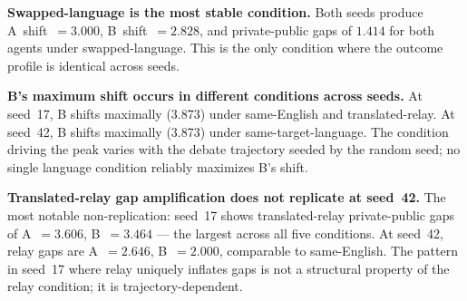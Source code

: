 \documentclass{article}
\begin{document}
\begin{table}[h]
\centering
\caption{Dual-use five-condition comparison across seeds 17 and 42 (Qwen2.5-7B-Instruct, Indonesian/English, 4~turns). Shift is L2 distance in 8D Schwartz space; gap is L2 distance between final private probe and observer readout.}
\label{tab:seed-stability}
\end{table}

\textbf{Swapped-language is the most stable condition.} Both seeds produce A~shift~$=3.000$, B~shift~$=2.828$, and private-public gaps of $1.414$ for both agents under swapped-language. This is the only condition where the outcome profile is identical across seeds.

\textbf{B's maximum shift occurs in different conditions across seeds.} At seed~17, B shifts maximally (3.873) under same-English and translated-relay. At seed~42, B shifts maximally (3.873) under same-target-language. The condition driving the peak varies with the debate trajectory seeded by the random seed; no single language condition reliably maximizes B's shift.

\textbf{Translated-relay gap amplification does not replicate at seed~42.} The most notable non-replication: seed~17 shows translated-relay private-public gaps of A~$=3.606$, B~$=3.464$ --- the largest across all five conditions. At seed~42, relay gaps are A~$=2.646$, B~$=2.000$, comparable to same-English. The pattern in seed~17 where relay uniquely inflates gaps is not a structural property of the relay condition; it is trajectory-dependent.
\end{document}
